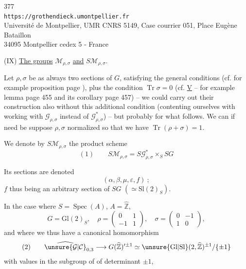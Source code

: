 
\begin{center}
377\\
\texttt{https://grothendieck.umontpellier.fr}\\
Université de Montpellier, UMR CNRS 5149, Case courrier 051, Place Eugène Bataillon\\
34095 Montpellier cedex 5 - France
\end{center}


(IX) \uline{The groups} $\mathcal{M}_{\rho,\sigma}$ \uline{and}
$S\mathcal{M}_{\rho,\sigma}$.

Let $\rho,\sigma$ be as always two sections of $G$, satisfying the
general conditions (cf. for example proposition page ), plus the
condition $\operatorname{Tr}\sigma=0$ (cf. \uline{V} -- for example lemma
page 455 and its corollary page 457) -- we could carry out their construction
also without this additional condition (contenting ourselves with
working with $\mathcal{G}_{\rho,\sigma}$ instead of
$\mathcal{G}_{\rho,\sigma}^{*}$) -- but 
probably for what follows. We can if need be suppose
$\rho,\sigma$ normalized so that we have
$\operatorname{Tr}(\rho+\sigma)=1$.

We denote by $S\mathcal{M}_{\rho,\sigma}$ the product scheme
\[
(1)\qquad S\mathcal{M}_{\rho,\sigma}
=S\mathcal{G}_{\rho,\sigma}^{*}\times_S SG
\]

Its sections are denoted
\[
(\alpha,\beta,\mu,\varepsilon,f)\ ;
\]
$f$ thus being an arbitrary section of $SG$
$(\simeq\mathrm{Sl}(2)_S)$.

In the case where $S=\operatorname{Spec}(A)$, $A=\widehat{\mathbb{Z}}$,
\[
G=\mathrm{Gl}(2)_S,\quad
\rho=\begin{pmatrix}0&1\\-1&1\end{pmatrix},\quad
\sigma=\begin{pmatrix}0&-1\\1&0\end{pmatrix},
\]
and where we thus have a canonical homomorphism
\[
(2)\qquad
\widehat{\unsure{\mathcal{G}|\mathcal{C}}}_{0,3}
\longrightarrow
G(\widehat{\mathbb{Z}})^{\prime\pm1}
\simeq\unsure{\mathrm{Gl}|\mathrm{Sl}}(2,\widehat{\mathbb{Z}})^{\pm1}/\{\pm1\}
\]
with values in the subgroup of  of determinant
$\pm1$,

